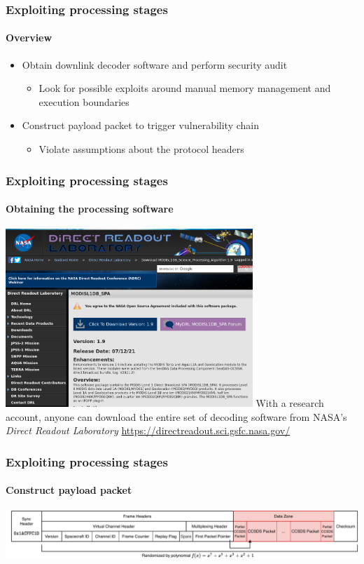\documentclass{beamer}
\begin{document}
\begin{frame}
  \frametitle{Exploiting processing stages}
  \framesubtitle{Overview}
  \begin{itemize}
   \item Obtain downlink decoder software and perform security audit
   \begin{itemize}
     \item Look for possible exploits around manual memory management and execution boundaries
   \end{itemize}
    \item Construct payload packet to trigger vulnerability chain
    \begin{itemize}
      \item Violate assumptions about the protocol headers
    \end{itemize}
  \end{itemize}
\end{frame}

\begin{frame}
  \frametitle{Exploiting processing stages}
  \framesubtitle{Obtaining the processing software}
  \centering
  \includegraphics[width=0.7\textwidth]{images/drl.png}
  \newline
  With a research account, anyone can download the entire set of decoding software from NASA's \textit{Direct Readout Laboratory}
  \newline
  \url{https://directreadout.sci.gsfc.nasa.gov/}
\end{frame}

\begin{frame}
  \frametitle{Exploiting processing stages}
  \framesubtitle{Construct payload packet}
  \centering
  \includegraphics[width=\textwidth]{images/cadu_diagram.pdf}
\end{frame}
\end{document}
